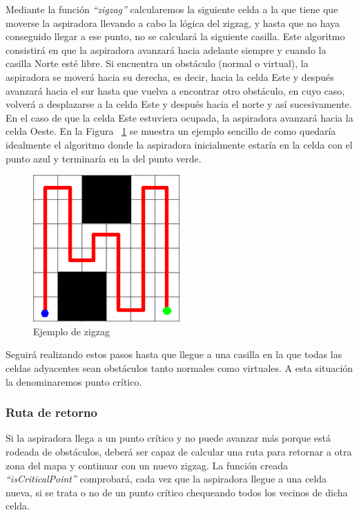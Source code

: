 Mediante la función \textit{``zigzag''} calcularemos la siguiente celda a la que tiene que moverse la aspiradora llevando a cabo la lógica del zigzag, y hasta que no haya conseguido llegar a ese punto, no se calculará la siguiente casilla. Este algoritmo consistirá en que la aspiradora avanzará hacia adelante siempre y cuando la casilla Norte esté libre. Si encuentra un obstáculo (normal o virtual), la aspiradora se moverá hacia su derecha, es decir, hacia la celda Este y después avanzará hacia el sur hasta que vuelva a encontrar otro obstáculo, en cuyo caso, volverá a desplazarse a la celda Este y después hacia el norte y así sucesivamente. En el caso de que la celda Este estuviera ocupada, la aspiradora avanzará hacia la celda Oeste. En la Figura ~\ref{fig.ejemplo} se muestra un ejemplo sencillo de como quedaría idealmente el algoritmo donde la aspiradora inicialmente estaría en la celda con el punto azul y terminaría en la del punto verde.

\begin{figure}[H]
  \begin{center}
    \includegraphics[width=0.5\textwidth]{figures/Vacuum/cuadriculaEj.png}
		\caption{Ejemplo de zigzag}
		\label{fig.ejemplo}
		\end{center}
\end{figure}

Seguirá realizando estos pasos hasta que llegue a una casilla en la que todas las celdas adyacentes sean obstáculos tanto normales como virtuales. A esta situación la denominaremos punto crítico.

\subsubsection{Ruta de retorno}
Si la aspiradora llega a un punto crítico y no puede avanzar más porque está rodeada de obstáculos, deberá ser capaz de calcular una ruta para retornar a otra zona del mapa y continuar con un nuevo zigzag. La función creada \textit{``isCriticalPoint''} comprobará, cada vez que la aspiradora llegue a una celda nueva, si se trata o no de un punto crítico chequeando todos los vecinos de dicha celda.\\

